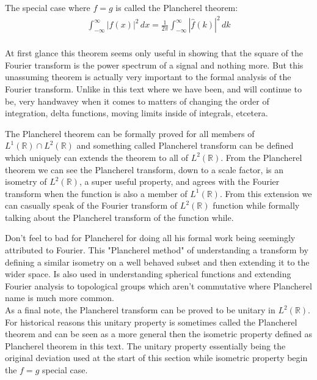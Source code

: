 The special case where $f = g$ is called the Plancherel theorem:
\begin{equation*}
\begin{aligned}
\int_{-\infty}^{\infty}|f(x)|^2\,dx = \frac{1}{2\pi}\int_{-\infty}^{\infty}|\hat{f}(k)|^2\,dk \\
\end{aligned}
\end{equation*}

At first glance this theorem seems only useful in showing that the square of the Fourier transform is the power spectrum of a signal and nothing more.
But this unassuming theorem is actually very important to the formal analysis of the Fourier transform.
Unlike in this text where we have been, and will continue to be, very handwavey when it comes to matters of changing the order of integration, delta functions, moving limits inside of integrals, etcetera. 

The Plancherel theorem can be formally proved for all members of $L^1(\mathbb{R})\cap L^2(\mathbb{R})$ and something called Plancherel transform can be defined which uniquely can extends the theorem to all of $L^2(\mathbb{R})$.
From the Plancherel theorem we can see the Plancherel transform, down to a scale factor, is an isometry of $L^2(\mathbb{R})$, a super useful property, and agrees with the Fourier transform when the function is also a member of $L^1(\mathbb{R})$.
From this extension we can casually speak of the Fourier transform of $L^2(\mathbb{R})$ function while formally talking about the Plancherel transform of the function while.

Don't feel to bad for Plancherel for doing all his formal work being seemingly attributed to Fourier.
This "Plancherel method" of understanding a transform by defining a similar isometry on a well behaved subset and then extending it to the wider space.
Is also used in understanding spherical functions and extending Fourier analysis to topological groups which aren't commutative where Plancherel name is much more common.
\\

As a final note, the Plancherel transform can be proved to be unitary in $L^2(\mathbb{R})$.
For historical reasons this unitary property is sometimes called the Plancherel theorem and can be seen as a more general then the isometric property defined as Plancherel theorem in this text. 
The unitary property essentially being the original deviation used at the start of this section while isometric property begin the $f=g$ special case.

